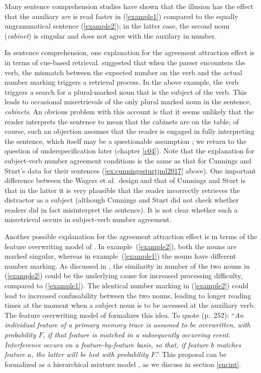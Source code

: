 \documentclass{cambridge7A}\usepackage[]{graphicx}\usepackage[]{color}
\begin{document}
Many sentence comprehension studies have shown that the illusion has the effect that the auxiliary \textit{are} is read faster in (\ref{example1}) compared to the equally ungrammatical sentence (\ref{example2}); in the latter case, the second noun (\textit{cabinet}) is singular and does not agree with the auxilary in number.

In sentence comprehension, one explanation for the  agreement attraction effect is in terms of  cue-based retrieval.  \cite{WagersLauPhillips2009} suggested that when the parser encounters the verb, the mismatch between the expected number on the verb and the actual number marking triggers a retrieval process. In the above example, the verb triggers a search for a plural-marked noun that is the subject of the verb. This leads to occasional misretrievals of the only plural marked noun in the sentence, \textit{cabinets}. An obvious problem with this account is that it seems unlikely that the reader interprets the sentence to mean that the cabinets are  on the table; of course, such an objection assumes that the reader is engaged in fully interpreting the sentence, which itself may be a questionable assumption \citep{SanfordSturt2002,FerreiraFerraroBailey2002}; we return to the question of  underspecification later (chapter \ref{c04}). Note that the explanation for subject-verb  number agreement conditions is the same as that for Cunnings and Sturt's  data for their  sentences (\ref{ex:cunningssturtjml2017} above). One important difference between the  Wagers et al.\  design and  that of Cunnings and Sturt  is that in the  latter it is very plausible that the reader incorrectly retrieves the distractor as a subject (although Cunnings and Sturt did not check whether readers did in fact misinterpret the sentence). It is not clear whether such a  misretrieval occurs in subject-verb number agreement.
  
Another possible explanation for the agreement attraction effect is in terms of the  feature overwriting model of \cite{Nairne1990}. In example~(\ref{example2}),
both the nouns are marked singular, whereas in example~(\ref{example1}) the nouns have different number marking. 
As discussed in \cite{VillataFranck},
the similarity in number of the two nouns in (\ref{example2}) could be the underlying cause for increased processing difficulty, compared to (\ref{example1}).
The identical number marking in (\ref{example2}) could lead to increased  confusability between the two nouns, leading to longer reading times at the moment when a subject noun is to be accessed at the auxiliary verb. 
The feature overwriting model of \cite{Nairne1990} formalizes this idea. To quote (p.\ 252):
``\textit{An individual feature of a primary memory trace is assumed to be overwritten, with probability $F$, if that feature is matched in a subsequently occurring event. Interference occurs on a feature-by-feature basis, so that, if feature $b$ matches feature $a$, the latter will be lost with probability $F$}.''
 This proposal can be formalized as a hierarchical mixture model \citep{VasishthEtAlICCM2017}, as we discuss in section \ref{encint}.
\end{document}
